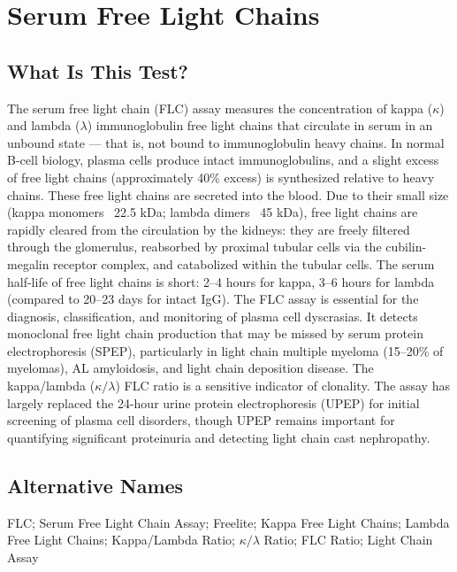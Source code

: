 \chapter{Serum Free Light Chains}

\section*{What Is This Test?}
The serum free light chain (FLC) assay measures the concentration of kappa ($\kappa$) and lambda ($\lambda$) immunoglobulin free light chains that circulate in serum in an unbound state --- that is, not bound to immunoglobulin heavy chains. In normal B-cell biology, plasma cells produce intact immunoglobulins, and a slight excess of free light chains (approximately 40\% excess) is synthesized relative to heavy chains. These free light chains are secreted into the blood. Due to their small size (kappa monomers ~22.5 kDa; lambda dimers ~45 kDa), free light chains are rapidly cleared from the circulation by the kidneys: they are freely filtered through the glomerulus, reabsorbed by proximal tubular cells via the cubilin-megalin receptor complex, and catabolized within the tubular cells. The serum half-life of free light chains is short: 2--4 hours for kappa, 3--6 hours for lambda (compared to 20--23 days for intact IgG). The FLC assay is essential for the diagnosis, classification, and monitoring of plasma cell dyscrasias. It detects monoclonal free light chain production that may be missed by serum protein electrophoresis (SPEP), particularly in light chain multiple myeloma (15--20\% of myelomas), AL amyloidosis, and light chain deposition disease. The kappa/lambda ($\kappa/\lambda$) FLC ratio is a sensitive indicator of clonality. The assay has largely replaced the 24-hour urine protein electrophoresis (UPEP) for initial screening of plasma cell disorders, though UPEP remains important for quantifying significant proteinuria and detecting light chain cast nephropathy.

\section*{Alternative Names}
FLC; Serum Free Light Chain Assay; Freelite; Kappa Free Light Chains; Lambda Free Light Chains; Kappa/Lambda Ratio; $\kappa/\lambda$ Ratio; FLC Ratio; Light Chain Assay

